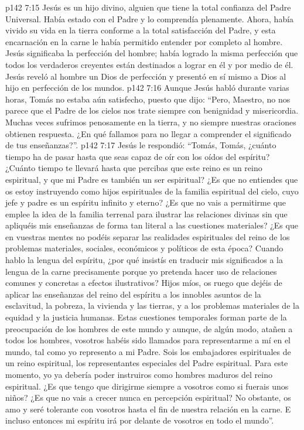 \vs p142 7:15 Jesús es un hijo divino, alguien que tiene la total confianza del Padre Universal. Había estado con el Padre y lo comprendía plenamente. Ahora, había vivido su vida en la tierra conforme a la total satisfacción del Padre, y esta encarnación en la carne le había permitido entender por completo al hombre. Jesús significaba la perfección del hombre; había logrado la misma perfección que todos los verdaderos creyentes están destinados a lograr en él y por medio de él. Jesús reveló al hombre un Dios de perfección y presentó en sí mismo a Dios al hijo en perfección de los mundos.
\vs p142 7:16 Aunque Jesús habló durante varias horas, Tomás no estaba aún satisfecho, puesto que dijo: “Pero, Maestro, no nos parece que el Padre de los cielos nos trate siempre con benignidad y misericordia. Muchas veces sufrimos penosamente en la tierra, y no siempre nuestras oraciones obtienen respuesta. ¿En qué fallamos para no llegar a comprender el significado de tus enseñanzas?”.
\vs p142 7:17 Jesús le respondió: “Tomás, Tomás, ¿cuánto tiempo ha de pasar hasta que seas capaz de oír con los oídos del espíritu? ¿Cuánto tiempo te llevará hasta que percibas que este reino es un reino espiritual, y que mi Padre es también un ser espiritual? ¿Es que no entiendes que os estoy instruyendo como hijos espirituales de la familia espiritual del cielo, cuyo jefe y padre es un espíritu infinito y eterno? ¿Es que no vais a permitirme que emplee la idea de la familia terrenal para ilustrar las relaciones divinas sin que apliquéis mis enseñanzas de forma tan literal a las cuestiones materiales? ¿Es que en vuestras mentes no podéis separar las realidades espirituales del reino de los problemas materiales, sociales, económicos y políticos de esta época? Cuando hablo la lengua del espíritu, ¿por qué insistís en traducir mis significados a la lengua de la carne precisamente porque yo pretenda hacer uso de relaciones comunes y concretas a efectos ilustrativos? Hijos míos, os ruego que dejéis de aplicar las enseñanzas del reino del espíritu a los innobles asuntos de la esclavitud, la pobreza, la vivienda y las tierras, y a los problemas materiales de la equidad y la justicia humanas. Estas cuestiones temporales forman parte de la preocupación de los hombres de este mundo y aunque, de algún modo, atañen a todos los hombres, vosotros habéis sido llamados para representarme a mí en el mundo, tal como yo represento a mi Padre. Sois los embajadores espirituales de un reino espiritual, los representantes especiales del Padre espiritual. Para este momento, yo ya debería poder instruiros como hombres maduros del reino espiritual. ¿Es que tengo que dirigirme siempre a vosotros como si fuerais unos niños? ¿Es que no vais a crecer nunca en percepción espiritual? No obstante, os amo y seré tolerante con vosotros hasta el fin de nuestra relación en la carne. E incluso entonces mi espíritu irá por delante de vosotros en todo el mundo”.
